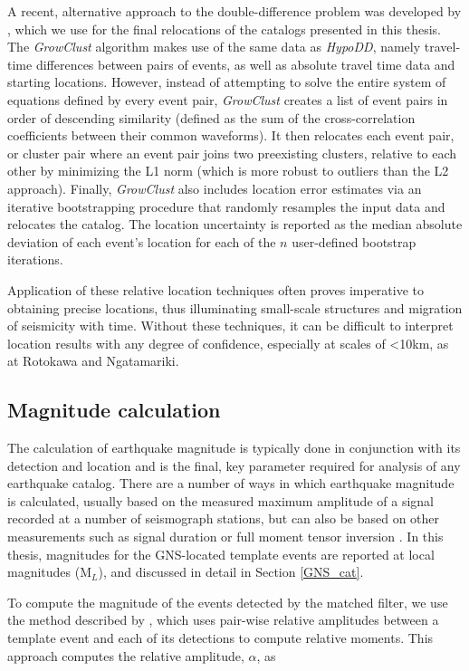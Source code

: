 A recent, alternative approach to the double-difference problem was developed by \citet{Trugman_2017}, which we use for the final relocations of the catalogs presented in this thesis. The \textit{GrowClust} algorithm makes use of the same data as \textit{HypoDD}, namely travel-time differences between pairs of events, as well as absolute travel time data and starting locations. However, instead of attempting to solve the entire system of equations defined by every event pair, \textit{GrowClust} creates a list of event pairs in order of descending similarity (defined as the sum of the cross-correlation coefficients between their common waveforms). It then relocates each event pair, or cluster pair where an event pair joins two preexisting clusters, relative to each other by minimizing the L1 norm (which is more robust to outliers than the L2 approach). Finally, \textit{GrowClust} also includes location error estimates via an iterative bootstrapping procedure that randomly resamples the input data and relocates the catalog. The location uncertainty is reported as the median absolute deviation of each event's location for each of the $n$ user-defined bootstrap iterations.

Application of these relative location techniques often proves imperative to obtaining precise locations, thus illuminating small-scale structures and migration of seismicity with time. Without these techniques, it can be difficult to interpret location results with any degree of confidence, especially at scales of \textless{10}km, as at Rotokawa and Ngatamariki.

\subsection{Magnitude calculation}
The calculation of earthquake magnitude is typically done in conjunction with its detection and location and is the final, key parameter required for analysis of any earthquake catalog. There are a number of ways in which earthquake magnitude is calculated, usually based on the measured maximum amplitude of a signal recorded at a number of seismograph stations, but can also be based on other measurements such as signal duration or full moment tensor inversion \citep{Kanamori_1983}. In this thesis, magnitudes for the GNS-located template events are reported at local magnitudes (M$_L$), and discussed in detail in Section \ref{GNS_cat}.

To compute the magnitude of the events detected by the matched filter,
we use the method described by \citet{Shelly_2016}, which uses pair-wise relative amplitudes between a template event and each of its detections to compute relative moments. This approach computes the relative amplitude, $\alpha$, as

